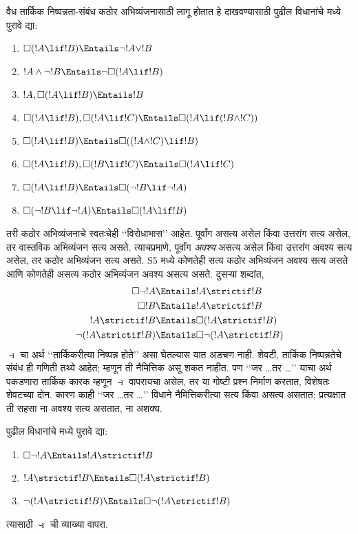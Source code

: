 \documentclass[../../../include/open-logic-section]{subfiles}
\begin{document}
\begin{prob}
  वैध तार्किक निष्पन्नता-संबंध
  कठोर अभिव्यंजनासाठी लागू होतात
  हे दाखवण्यासाठी पुढील
  विधानांचे  मध्ये
  पुरावे द्या:
  \begin{enumerate}
  \item  $\Box(!A \lif !B) \Entails \lnot !A \lor !B$
  \item $!A \land \lnot !B \Entails \lnot\Box(!A \lif !B)$
  \item $!A, \Box(!A \lif !B) \Entails !B$
  \item $\Box(!A \lif !B), \Box(!A \lif !C) \Entails \Box(!A \lif (!B
    \land !C))$
  \item $\Box(!A \lif !B) \Entails \Box((!A \land !C) \lif !B)$
  \item $\Box(!A \lif !B), \Box(!B \lif !C) \Entails \Box(!A
    \lif !C)$
  \item $\Box(!A \lif !B) \Entails \Box(\lnot !B \lif \lnot !A)$
  \item $\Box(\lnot !B \lif \lnot !A) \Entails \Box(!A \lif !B)$
  \end{enumerate}
  \end{prob}

तरी कठोर अभिव्यंजनाचे स्वतःचेही
‘‘विरोधाभास’’ आहेत. पूर्वांग असत्य
असेल किंवा उत्तरांग सत्य असेल,
तर वास्तविक अभिव्यंजन सत्य
असते. त्याचप्रमाणे, पूर्वांग
\emph{अवश्य} असत्य असेल
किंवा उत्तरांग अवश्य सत्य असेल,
तर कठोर अभिव्यंजन सत्य असते.
S5 मध्ये कोणतेही सत्य कठोर
अभिव्यंजन अवश्य सत्य असते
आणि कोणतेही असत्य कठोर
अभिव्यंजन अवश्य असत्य असते.
दुसऱ्या शब्दांत,
\begin{align}
  \Box \lnot !A & \Entails !A \strictif !B\\
  \Box !B & \Entails !A \strictif !B\\
  !A \strictif !B& \Entails \Box(!A \strictif !B)\\
  \lnot(!A \strictif !B) & \Entails \Box\lnot(!A \strictif !B)
\end{align}
$\strictif$ चा अर्थ ‘‘तार्किकरीत्या
निष्पन्न होते’’ असा घेतल्यास
यात अडचण नाही. शेवटी,
तार्किक निष्पन्नतेचे संबंध ही
गणिती तथ्ये आहेत; म्हणून
ती नैमित्तिक असू शकत नाहीत.
पण ‘‘जर \dots तर \dots’’
याचा अर्थ पकडणारा तार्किक
कारक म्हणून $\strictif$
वापरायचा असेल, तर या
गोष्टी प्रश्न निर्माण करतात,
विशेषतः शेवटच्या दोन.
कारण काही ‘‘जर \dots तर \dots’’
विधाने नैमित्तिकरीत्या
सत्य किंवा असत्य असतात;
प्रत्यक्षात ती सहसा
ना अवश्य सत्य असतात,
ना अशक्य.

\begin{prob}
  पुढील विधानांचे 
  मध्ये पुरावे द्या:
  \begin{enumerate}
    \item  $\Box \lnot !A \Entails !A \strictif !B$
    \item $!A \strictif !B \Entails \Box(!A \strictif !B)$
    \item $\lnot(!A \strictif !B)  \Entails \Box\lnot(!A \strictif !B)$
  \end{enumerate}
  त्यासाठी $\strictif$ ची
  व्याख्या वापरा.
\end{prob}
\end{document}

